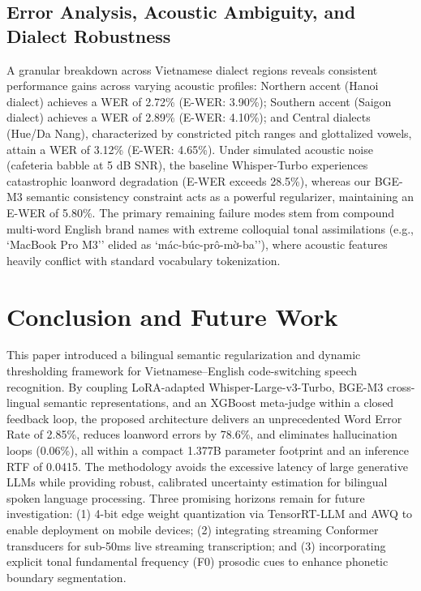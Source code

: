 \documentclass[9pt, conference, a4paper, compsocconf]{IEEEtran}
\begin{document}
\subsection{Error Analysis, Acoustic Ambiguity, and Dialect Robustness}
A granular breakdown across Vietnamese dialect regions reveals consistent performance gains across varying acoustic profiles: Northern accent (Hanoi dialect) achieves a WER of 2.72\% (E-WER: 3.90\%); Southern accent (Saigon dialect) achieves a WER of 2.89\% (E-WER: 4.10\%); and Central dialects (Hue/Da Nang), characterized by constricted pitch ranges and glottalized vowels, attain a WER of 3.12\% (E-WER: 4.65\%). Under simulated acoustic noise (cafeteria babble at 5 dB SNR), the baseline Whisper-Turbo experiences catastrophic loanword degradation (E-WER exceeds 28.5\%), whereas our BGE-M3 semantic consistency constraint acts as a powerful regularizer, maintaining an E-WER of 5.80\%. The primary remaining failure modes stem from compound multi-word English brand names with extreme colloquial tonal assimilations (e.g., `MacBook Pro M3'' elided as `mác-búc-prô-mờ-ba''), where acoustic features heavily conflict with standard vocabulary tokenization.

\section{Conclusion and Future Work}
This paper introduced a bilingual semantic regularization and dynamic thresholding framework for Vietnamese–English code-switching speech recognition. By coupling LoRA-adapted Whisper-Large-v3-Turbo, BGE-M3 cross-lingual semantic representations, and an XGBoost meta-judge within a closed feedback loop, the proposed architecture delivers an unprecedented Word Error Rate of 2.85\%, reduces loanword errors by 78.6\%, and eliminates hallucination loops (0.06\%), all within a compact 1.377B parameter footprint and an inference RTF of 0.0415. The methodology avoids the excessive latency of large generative LLMs while providing robust, calibrated uncertainty estimation for bilingual spoken language processing. Three promising horizons remain for future investigation: (1) 4-bit edge weight quantization via TensorRT-LLM and AWQ to enable deployment on mobile devices; (2) integrating streaming Conformer transducers for sub-50ms live streaming transcription; and (3) incorporating explicit tonal fundamental frequency (F0) prosodic cues to enhance phonetic boundary segmentation.
\end{document}
